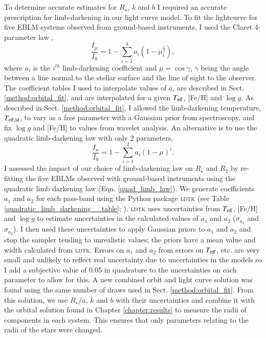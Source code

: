 To determine accurate estimates for $R_{\star}$, $k$ and $b$ I required an accurate prescription for limb-darkening in our light curve model.  To fit the lightcurve for five EBLM systems observed from ground-based instruments, I used the Claret 4-parameter law \citep{Claret2000},
%
\begin{equation}\label{claret_limb_law}
\frac{I_\mu}{I_0} = 1 - \sum_{i =1}^{4} a_i(1-\mu^{\frac{1}{2}}_i),
\end{equation}
%
where $a_i$ is the $i^{th}$ limb-darkening coefficient and $\mu = \cos \gamma$, $\gamma$ being the angle between a line normal to the stellar surface and the line of sight to the observer. The coefficient tables I used to interpolate values of $a_i$ are described in Sect. \ref{method:orbital_fit}, and are interpolated for a given $T_{\rm eff}$, [Fe/H] and $\log g$. As described in Sect. \ref{method:orbital_fit}, I allowed the limb-darkening temperature, $T_{\rm eff, ld}$, to vary as a free parameter with a Gaussian prior from spectroscopy, and fix $\log g$ and [Fe/H] to values from wavelet analysis. An alternative is to use the quadratic limb-darkening law \citep{1950HarCi.454....1K} with only 2 parameters,
%
\begin{equation}\label{quad_limb_law}
\frac{I_u}{I_0} = 1 - \sum_{i =1}^{2} a_i (1 - \mu)^i.
\end{equation}
%
I assessed the impact of our choice of limb-darkening law on $R_{\star}$ and $R_2$ by re-fitting the five EBLMs observed with ground-based instruments using the quadratic limb darkening law (Eqn. \ref{quad_limb_law}). We generate coefficients $a_1$ and $a_2$ for each pass-band using the Python package \textsc{ldtk} (see Table \ref{quadratic_limb_darkening__table}; \citealt{Parviainen2015}). \textsc{ldtk} uses uncertainties from $T_{\rm eff}$, [Fe/H] and $\log g$ to estimate uncertainties in the calculated values of $a_1$ and $a_2$ ($\sigma_{a_1}$ and $\sigma_{a_2}$). I then used these uncertainties to apply Gaussian priors to $a_1$ and $a_2$ and stop the sampler tending to unrealistic values; the priors have a mean value and width calculated from \textsc{ldtk}. Errors on $a_1$ and $a_2$ from errors on $T_{\rm eff}$, etc. are very small and unlikely to reflect real uncertainty due to uncertainties in the models so I add a subjective value of 0.05 in quadrature to the uncertainties on each parameter to allow for this. A new combined orbit and light curve solution was found using the same number of draws used in Sect. \ref{method:orbital_fit}. From this solution, we use $R_{\star}/a$, $k$ and $b$ with their uncertainties and combine it with the orbital solution found in Chapter \ref{chapter:results} to measure the radii of components in each system. This ensures that only parameters relating to the radii of the stars were changed. 


